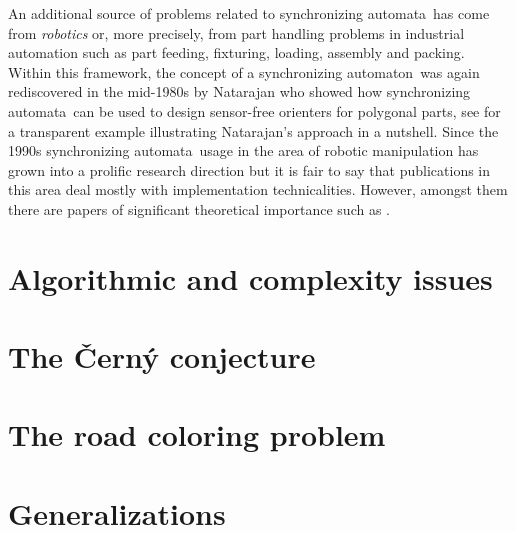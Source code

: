 \documentclass{irmaart}
\newcommand{\sa}{synchronizing au\-tom\-a\-ta}
\newcommand{\san}{synchronizing au\-tom\-a\-ton}
\begin{document}
An additional source of problems related to \sa\ has come from
\emph{robotics} or, more precisely, from part handling problems
in industrial automation such as part feeding, fixturing, loading,
assembly and packing. Within this framework, the concept of a \san\
was again rediscovered in the mid-1980s by Natarajan \cite{Natarajan:1986,
Natarajan:1989} who showed how \sa\ can be used to design sensor-free
orienters for polygonal parts, see \cite[Section~1]{Volkov:2008} for
a transparent example illustrating Natarajan's approach in a nutshell.
Since the 1990s \sa\ usage in the area of robotic manipulation has grown
into a prolific research direction but it is fair to say that publications
in this area deal mostly with implementation technicalities. However,
amongst them there are papers of significant theoretical importance
such as \cite{Eppstein:1990,Goldberg:1993,Chen&Ierardi:1995}.

\section{Algorithmic and complexity issues}

\section{The \v{C}ern\'{y} conjecture}

\section{The road coloring problem}

\section{Generalizations}


\begin{footnotesize}
  
\end{footnotesize}


\markright{\indexname}\markboth{\indexname}{\indexname}
\printindex
\end{document}
